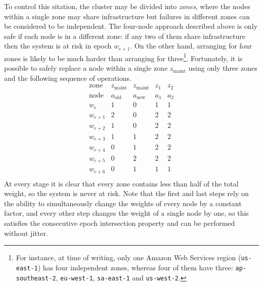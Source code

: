 \documentclass[journal]{IEEEtran}
\begin{document}
To control this sitation, the cluster may be divided into \textit{zones}, where
the nodes within a single zone may share infrastructure but failures in
different zones can be considered to be independent.  The four-node approach
described above is only safe if each node is in a different zone: if any two of
them share infrastructure then the system is at risk in epoch $w_{e+1}$. On the
other hand, arranging for four zones is likely to be much harder than arranging
for three\footnote{For instance, at time of writing, only one Amazon Web
Services region (\texttt{us-east-1}) has four independent zones, whereas four
of them have three: \texttt{ap-southeast-2}, \texttt{eu-west-1},
\texttt{sa-east-1} and \texttt{us-west-2}.}.  Fortunately, it is possible to
safely replace a node within a single zone $z_{\textrm{maint}}$ using only
three zones and the following sequence of operations.
\[\begin{array}{rcccc}
\textrm{zone}&z_{\textrm{maint}}&z_{\textrm{maint}}&z_1&z_2\\
\textrm{node}&a_{\textrm{old}}&a_{\textrm{new}}&a_1&a_2\\
w_e&1&0&1&1\\
w_{e+1}&2&0&2&2\\
w_{e+2}&1&0&2&2\\
w_{e+3}&1&1&2&2\\
w_{e+4}&0&1&2&2\\
w_{e+5}&0&2&2&2\\
w_{e+6}&0&1&1&1\\
\end{array}\]
At every stage it is clear that every zone contains less than half of the total
weight, so the system is never at risk. Note that the first and last steps rely
on the ability to simultaneously change the weights of every node by a constant
factor, and every other step changes the weight of a single node by one, so
this satisfies the consecutive epoch intersection property and can be performed
without jitter.



%
%
\end{document}
